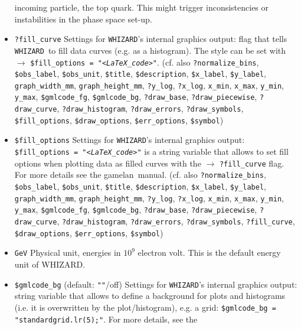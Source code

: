 \documentclass[12pt]{book}
\newcommand{\ttt}[1]{\texttt{#1}}
\newcommand{\whizard}{\texttt{WHIZARD}}
\newcommand{\gamelan}{\textsf{gamelan}}
\begin{document}
\begin{itemize}
incoming particle, the top quark. This might trigger inconsistencies
or instabilities in the phase space set-up.
\item
\ttt{?fill\_curve} \newline
Settings for \whizard's internal graphics output: flag that tells
\whizard\ to fill data curves (e.g. as a histogram). The style can be
set with $\to$ \ttt{\$fill\_options = "{\em <LaTeX\_code>}"}. (cf. also
\ttt{?normalize\_bins}, \ttt{\$obs\_label}, \ttt{\$obs\_unit}, 
\ttt{\$title}, \ttt{\$description}, \ttt{\$x\_label},
\ttt{\$y\_label}, \ttt{graph\_width\_mm}, \ttt{graph\_height\_mm},
\ttt{?y\_log}, \ttt{?x\_log}, \ttt{x\_min}, \ttt{x\_max}, 
\ttt{y\_min}, \ttt{y\_max}, \newline \ttt{\$gmlcode\_fg}, \ttt{\$gmlcode\_bg},
\ttt{?draw\_base}, \ttt{?draw\_piecewise},
\ttt{?draw\_curve}, \ttt{?draw\_histogram}, \ttt{?draw\_errors},
\ttt{?draw\_symbols}, \ttt{\$fill\_options}, \ttt{\$draw\_options},
\ttt{\$err\_options}, \ttt{\$symbol})
\item
\ttt{\$fill\_options} \newline
Settings for \whizard's internal graphics output: 
\ttt{\$fill\_options = "{\em <LaTeX\_code>}"} is a string variable that
allows to set fill options 
when plotting data as filled curves with the $\to$ \ttt{?fill\_curve}
flag. For more details see the \gamelan\ manual. (cf. also 
\ttt{?normalize\_bins}, \ttt{\$obs\_label}, \ttt{\$obs\_unit}, 
\ttt{\$title}, \ttt{\$description}, \ttt{\$x\_label},
\ttt{\$y\_label}, \ttt{graph\_width\_mm}, \ttt{graph\_height\_mm},
\ttt{?y\_log}, \ttt{?x\_log}, \ttt{x\_min}, \ttt{x\_max}, 
\ttt{y\_min}, \ttt{y\_max}, \ttt{\$gmlcode\_fg}, \ttt{\$gmlcode\_bg},
\ttt{?draw\_base}, \ttt{?draw\_piecewise},
\ttt{?draw\_curve}, \ttt{?draw\_histogram}, \ttt{?draw\_errors},
\newline \ttt{?draw\_symbols}, \ttt{?fill\_curve}, \ttt{\$draw\_options},
\ttt{\$err\_options}, \ttt{\$symbol})
\item
\ttt{GeV} \newline 
Physical unit, energies in $10^9$ electron volt. This is the default
energy unit of WHIZARD.
\item
\ttt{\$gmlcode\_bg} \qquad (default: \ttt{""}/off) \newline
Settings for \whizard's internal graphics output: string variable that
allows to define a background for plots and histograms (i.e. it is
overwritten by the plot/histogram), e.g. a grid: 
\ttt{\$gmlcode\_bg = "standardgrid.lr(5);"}. For more details, see the

\end{itemize}
\end{document}
